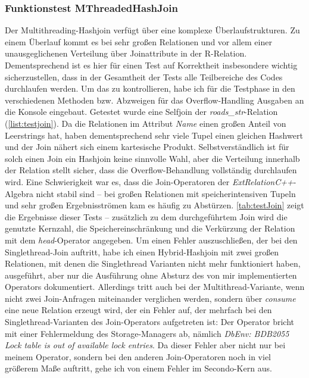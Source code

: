 \documentclass[a4paper,12pt,twoside]{article}
\newcommand{\Fb}[1]{\textit{#1}} %
\begin{document}
{\subsubsection{Funktionstest MThreadedHashJoin}

Der Multithreading-Hashjoin verfügt über eine komplexe Überlaufstrukturen. Zu einem Überlauf kommt es bei sehr großen Relationen und vor allem einer unausgeglichenen Verteilung über Joinattribute in der R-Relation. Dementsprechend ist es hier für einen Test auf Korrektheit insbesondere wichtig sicherzustellen, dass in der Gesamtheit der Tests alle Teilbereiche des Codes durchlaufen werden. Um das zu kontrollieren, habe ich für die Testphase in den verschiedenen Methoden bzw. Abzweigen für das Overflow-Handling Ausgaben an die Konsole eingebaut. Getestet wurde eine Selfjoin der \Fb{roads\_str}-Relation (\autoref{list:testjoin}). Da die Relationen im Attribut \Fb{Name} einen großen Anteil von Leerstrings hat, haben dementsprechend sehr viele Tupel einen gleichen Hashwert und der Join nähert sich einem kartesische Produkt. Selbstverständlich ist für solch einen Join ein Hashjoin keine sinnvolle Wahl, aber die Verteilung innerhalb der Relation stellt sicher, dass die Overflow-Behandlung vollständig durchlaufen wird. Eine Schwierigkeit war es, dass die Join-Operatoren der \Fb{ExtRelationC++}-Algebra nicht stabil sind -- bei großen Relationen mit speicherintensiven Tupeln und sehr großen Ergebnisströmen kam es häufig zu Abstürzen. \autoref{tab:testJoin} zeigt die Ergebnisse dieser Tests -- zusätzlich zu dem durchgeführtem Join wird die genutzte Kernzahl, die Speichereinschränkung und die Verkürzung der Relation mit dem \Fb{head}-Operator angegeben. Um einen Fehler auszuschließen, der bei den Singlethread-Join auftritt, habe ich einen Hybrid-Hashjoin mit zwei großen Relationen, mit denen die Singlethread Varianten nicht mehr funktioniert haben, ausgeführt, aber nur die Ausführung ohne Absturz des von mir implementierten Operators dokumentiert. Allerdings tritt auch bei der Multithread-Variante, wenn nicht zwei Join-Anfragen miteinander verglichen werden, sondern über \Fb{consume} eine neue Relation erzeugt wird, der ein Fehler auf, der mehrfach bei den Singlethread-Varianten des Join-Operators aufgetreten ist: Der Operator bricht mit einer Fehlermeldung des Storage-Managers ab, nämlich \Fb{DbEnv: BDB2055 Lock table is out of available lock entries}. Da dieser Fehler aber nicht nur bei meinem Operator, sondern bei den anderen Join-Operatoren noch in viel größerem Maße auftritt, gehe ich von einem Fehler im Secondo-Kern aus.

}
\end{document}
